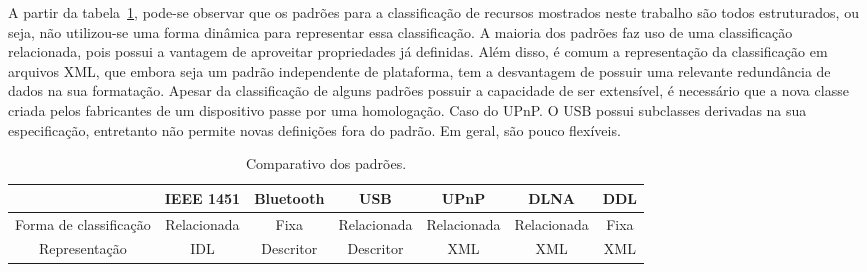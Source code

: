 A partir da tabela~\ref{tab:comparativo}, pode-se observar que os padrões para a classificação de recursos mostrados neste trabalho são todos estruturados, ou seja, não utilizou-se uma forma dinâmica para representar essa classificação. A maioria dos padrões faz uso de uma classificação relacionada, pois possui a vantagem de aproveitar propriedades já definidas. Além disso, é comum a representação da classificação em arquivos XML, que embora seja um padrão independente de plataforma, tem a desvantagem de possuir uma relevante redundância de dados na sua formatação. Apesar da classificação de alguns padrões possuir a capacidade de ser extensível, é necessário que a nova classe criada pelos fabricantes de um dispositivo passe por uma homologação. Caso do UPnP. O USB possui subclasses derivadas na sua especificação, entretanto não permite novas definições fora do padrão. Em geral, são pouco flexíveis. 

\begin{table}
	\caption{Comparativo dos padrões.}
	\begin{center}
	\resizebox{16cm}{!} {
		\begin{tabular}{ccccccc}
		\hline
							& \textbf{IEEE 1451}	& \textbf{Bluetooth} 	& \textbf{USB}	& \textbf{UPnP} & \textbf{DLNA} & \textbf{DDL}\\
		\hline
		Forma de classificação 		& Relacionada 			& Fixa 					& Relacionada 	& Relacionada 	& Relacionada 	& Fixa \\
		\hline
		Representação 		& IDL 					& Descritor				& Descritor		& XML			& XML 			& XML \\ 
		\hline
		\end{tabular}
	}
	\end{center}
	\label{tab:comparativo}
\end{table}

